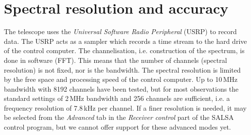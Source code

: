 \section{Spectral resolution and accuracy}
The telescope uses the \emph{Universal Software Radio Peripheral} (USRP) to
record data. The USRP acts as a sampler which records a time stream to the hard
drive of the control computer. The channelisation, i.e. construction of the
spectrum, is done in software (FFT). This means that the number of channels
(spectral resolution) is not fixed, nor is the bandwidth. The spectral
resolution is limited by the free space and processing speed of the control
computer. Up to 10\,MHz bandwidth with 8192 channels have been tested, but for
most observations the standard settings of 2\,MHz bandwidth and 256 channels
are sufficient, i.e. a frequency resolution of 7.8\,kHz per channel. If a finer
resolution is needed, it may be selected from the \emph{Advanced} tab in the
\emph{Receiver control} part of the SALSA control program, but we cannot offer
support for these advanced modes yet.
